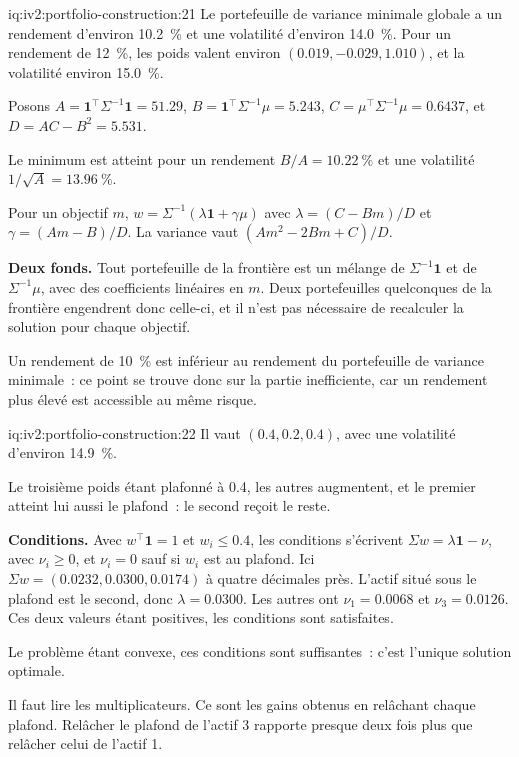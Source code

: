 \begin{solution}{iq:iv2:portfolio-construction:21}
Le portefeuille de variance minimale globale a un rendement d'environ 10.2~\% et une volatilité d'environ 14.0~\%. Pour un rendement de 12~\%, les poids valent environ $(0.019, -0.029, 1.010)$, et la volatilité environ 15.0~\%.

Posons $A = \mathbf{1}^\top\Sigma^{-1}\mathbf{1} = 51.29$, $B = \mathbf{1}^\top\Sigma^{-1}\mu = 5.243$, $C = \mu^\top\Sigma^{-1}\mu = 0.6437$, et $D = AC - B^2 = 5.531$.

Le minimum est atteint pour un rendement $B/A = 10.22~\%$ et une volatilité $1/\sqrt{A} = 13.96~\%$.

Pour un objectif $m$, $w = \Sigma^{-1}(\lambda\mathbf{1} + \gamma\mu)$ avec $\lambda = (C - Bm)/D$ et $\gamma = (Am - B)/D$. La variance vaut $(Am^2 - 2Bm + C)/D$.

\textbf{Deux fonds.} Tout portefeuille de la frontière est un mélange de $\Sigma^{-1}\mathbf{1}$ et de $\Sigma^{-1}\mu$, avec des coefficients linéaires en $m$. Deux portefeuilles quelconques de la frontière engendrent donc celle-ci, et il n'est pas nécessaire de recalculer la solution pour chaque objectif.

Un rendement de 10~\% est inférieur au rendement du portefeuille de variance minimale~: ce point se trouve donc sur la partie inefficiente, car un rendement plus élevé est accessible au même risque.

\end{solution}

\begin{solution}{iq:iv2:portfolio-construction:22}
Il vaut $(0.4, 0.2, 0.4)$, avec une volatilité d'environ 14.9~\%.

Le troisième poids étant plafonné à 0.4, les autres augmentent, et le premier atteint lui aussi le plafond~: le second reçoit le reste.

\textbf{Conditions.} Avec $w^\top\mathbf{1} = 1$ et $w_i \le 0.4$, les conditions s'écrivent $\Sigma w = \lambda\mathbf{1} - \nu$, avec $\nu_i \ge 0$, et $\nu_i = 0$ sauf si $w_i$ est au plafond. Ici $\Sigma w = (0.0232, 0.0300, 0.0174)$ à quatre décimales près. L'actif situé sous le plafond est le second, donc $\lambda = 0.0300$. Les autres ont $\nu_1 = 0.0068$ et $\nu_3 = 0.0126$. Ces deux valeurs étant positives, les conditions sont satisfaites.

Le problème étant convexe, ces conditions sont suffisantes~: c'est l'unique solution optimale.

Il faut lire les multiplicateurs. Ce sont les gains obtenus en relâchant chaque plafond. Relâcher le plafond de l'actif 3 rapporte presque deux fois plus que relâcher celui de l'actif 1.

\end{solution}

